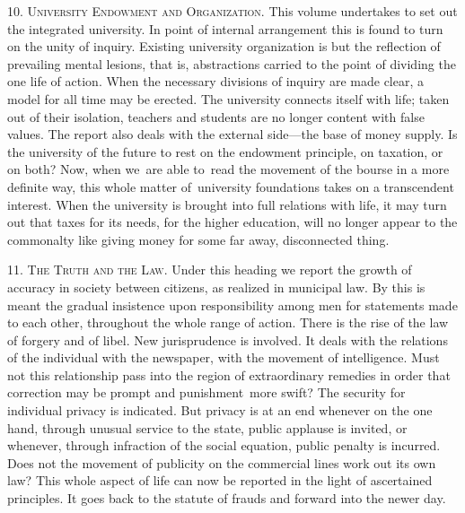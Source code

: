 \documentclass[twoside,symmetric,nobib,justified]{tufte-book}
\begin{document}
10. \textsc{University Endowment and Organization}. This volume undertakes to set
out the integrated university. In point of internal arrangement this is
found to turn on the unity of inquiry. Existing university organization
is but the reflection of prevailing mental lesions, that is,
abstractions carried to the point of dividing the one life of action.
When the necessary divisions of inquiry are made clear, a model for all
time may be erected. The university connects itself with life; taken out
of their isolation, teachers and students are no longer content with
false values. The report also deals with the external side---the base of
money supply. Is the university of the future to rest on the endowment
principle, on taxation, or on both? Now, when we~are able to~read the
movement of the bourse in a more definite way, this whole matter
of~university foundations takes on a transcendent interest. When the
university is brought into full relations with life, it may turn out
that taxes for its needs, for the higher education, will no longer
appear to the commonalty like giving money for some far away,
disconnected thing.~

\vspace{0.05in}

11. \textsc{The Truth and the Law}. Under this heading we report the growth of
accuracy in society between citizens, as realized in municipal law. By
this is meant the gradual insistence upon responsibility among men for
statements made to each other, throughout the whole range of action.
There is the rise of the law of forgery and of libel. New jurisprudence
is involved. It deals with the relations of the individual with the
newspaper, with the movement of intelligence. Must not this relationship
pass into the region of extraordinary remedies in order that correction
may be prompt and punishment~more swift? The security for individual
privacy is indicated. But privacy is at an end whenever on the one hand,
through unusual service to the state, public applause is invited, or
whenever, through infraction of the social equation, public penalty is
incurred. Does not the movement of publicity on the commercial lines
work out its own law? This whole aspect of life can now be reported in
the light of ascertained principles. It goes back to the statute of
frauds and forward into the newer day.~

\vspace{0.05in}
\end{document}
